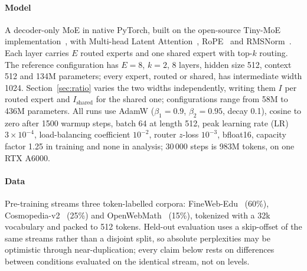 \documentclass[conference,11pt]{IEEEtran}
\begin{document}
\paragraph{Model} A decoder-only MoE in native PyTorch, built on the open-source Tiny-MoE
implementation~\cite{ebied2026tinymoe}, with Multi-head Latent Attention~\cite{deepseekv2}, RoPE~\cite{su2021roformer} and RMSNorm~\cite{zhang2019rmsnorm}. Each
layer carries $E$ routed experts and one shared expert with top-$k$ routing. The reference
configuration has $E=8$, $k=2$, 8 layers, hidden size 512, context 512 and 134M parameters; every
expert, routed or shared, has intermediate width 1024. Section~\ref{sec:ratio} varies the two
widths independently, writing them $I$ per routed expert and $I_{\mathrm{shared}}$ for the shared
one; configurations range from 58M to 436M parameters. All runs use AdamW ($\beta_1{=}0.9$,
$\beta_2{=}0.95$, decay 0.1), cosine to zero after 1500 warmup steps, batch 64 at length 512, peak learning rate (LR) $3\times10^{-4}$, load-balancing coefficient $10^{-2}$, router $z$-loss $10^{-3}$,
bfloat16, capacity factor 1.25 in training and none in analysis; 30\,000 steps is 983M tokens, on
one RTX A6000.

\paragraph{Data} Pre-training streams three token-labelled corpora:
FineWeb-Edu~\cite{penedo2024fineweb} (60\%), Cosmopedia-v2~\cite{benallal2024cosmopedia} (25\%)
and OpenWebMath~\cite{paster2023openwebmath} (15\%), tokenized with a 32k vocabulary and packed to
512 tokens. Held-out evaluation uses a skip-offset of the same streams rather than a disjoint
split, so absolute perplexities may be optimistic through near-duplication; every claim below rests on
differences between conditions evaluated on the identical stream, not on levels.
\end{document}
